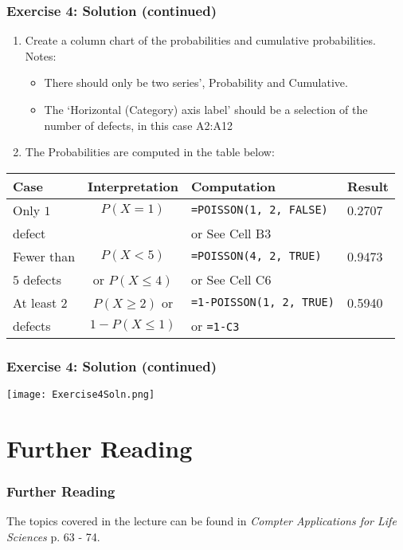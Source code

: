 \documentclass[12pt]{beamer}
\begin{document}
	\begin{frame}
		\frametitle{Exercise 4: Solution (continued)}
		\begin{enumerate}
			\item Create a column chart of the probabilities and cumulative probabilities. 
			Notes: 
			\begin{itemize} 
				\item There should only be two series', Probability and Cumulative.
				\item The `Horizontal (Category)  axis label' should be a selection of the number of defects, in this case A2:A12
			\end{itemize}
		\item The Probabilities are computed in the table below:
		\end{enumerate}
		\begin{center}
			\begin{tabular}{ l | c | l | l }
				Case & Interpretation & Computation & Result \\
				\hline
				Only $1$& $P(X=1)$& \texttt{=POISSON(1, 2, FALSE)} & 0.2707 \\
				 defect&&or See Cell B3&\\
				 \hline
				Fewer than& $P(X<5)$ & \texttt{=POISSON(4, 2, TRUE)} & 0.9473 \\
				$5 $ defects &or $P(X\leq4)$& or See Cell C6& \\
				\hline
				At least $2$ & $P(X\geq2)$ or & \texttt{=1-POISSON(1, 2, TRUE)} & 0.5940\\
				defects & $1-P(X\leq1)$ & or  \texttt{=1-C3}& 
			\end{tabular}
		\end{center}
	\end{frame}
	\begin{frame}
		\frametitle{Exercise 4: Solution (continued)}
		\begin{center}
			\texttt{[image: Exercise4Soln.png]}
		\end{center}
	\end{frame}
\section{Further Reading}
	\begin{frame}
		\frametitle{Further Reading}
		The topics covered in the lecture can be found in \textit{Compter Applications for Life Sciences} p. 63 - 74.
	\end{frame}
\end{document}
